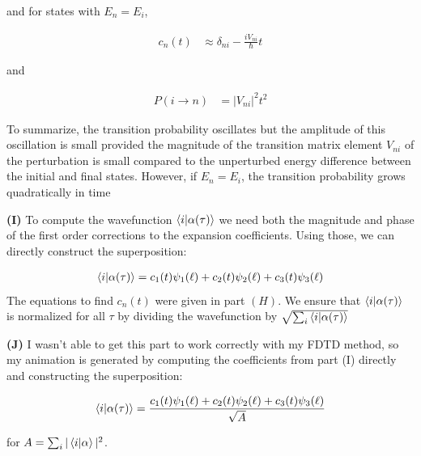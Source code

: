 \documentclass[12pt]{article}
\theoremstyle{definition}
\begin{document}
{and for states with $E_{n}=E_{i}$, 

\begin{align*}
c_{n}(t) &\approx \delta_{ni} - \frac{iV_{ni}}{\hbar}t
\end{align*}

and 

\begin{align}
P(i\rightarrow n) &= |V_{ni}|^{2}t^{2}
\end{align}

To summarize, the transition probability oscillates but the amplitude of this oscillation is small provided the magnitude of the transition matrix element $V_{ni}$ of the perturbation is small compared to the unperturbed energy difference between the initial and final states. However, if $E_{n} = E_{i}$, the transition probability grows quadratically in time

\noindent \textbf{(I)} To compute the wavefunction $\bra{i}\ket{\alpha(\tau)}$ we need both the magnitude and phase of the first order corrections to the expansion coefficients. Using those, we can directly construct the superposition:

\begin{align*}
\bra{i}\ket{\alpha(\tau)} = c_{1}(t)\psi_{1}(\ell) + c_{2}(t)\psi_{2}(\ell) + c_{3}(t)\psi_{3}(\ell)
\end{align*}The equations to find $c_{n}(t)$ were given in part $(H)$. We ensure that $\bra{i}\ket{\alpha(\tau)}$ is normalized for all $\tau$ by dividing the wavefunction by $\sqrt{\sum_{i}\bra{i}\ket{\alpha(\tau)}}$


\noindent \textbf{(J)} I wasn't able to get this part to work correctly with my FDTD method, so my animation is generated by computing the coefficients from part (I) directly and constructing the superposition:

\begin{align*}
\bra{i}\ket{\alpha(\tau)} = \frac{c_{1}(t)\psi_{1}(\ell) + c_{2}(t)\psi_{2}(\ell) + c_{3}(t)\psi_{3}(\ell)}{\sqrt{A}}
\end{align*}

for $A = \sum_{i}|\bra{i}\ket{\alpha}|^{2}$.

}
\end{document}
